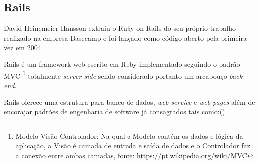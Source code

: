 \subsection{Rails}

\par David Heinemeier Hansson extraiu o Ruby on Rails do seu próprio trabalho realizado na empresa Basecamp e foi lançado como código-aberto pela primeira vez em 2004
\par Rails é um framework web escrito em Ruby implementado seguindo o padrão MVC \footnote{Modelo-Visão Controlador: Na qual o Modelo contém os dados e lógica da aplicação, a Visão é camada de entrada e saída de dados e o Controlador faz a conexão entre ambas camadas, fonte: \url{https://pt.wikipedia.org/wiki/MVC} } totalmente \emph{server-side} sendo considerado portanto um arcabouço \emph{ back-end}.
\par Rails oferece uma estrutura para banco de dados, \emph{web service} e \emph{web pages} além de encorajar padrões de engenharia de software já consagrados tais como:(\cite{railswiki})
